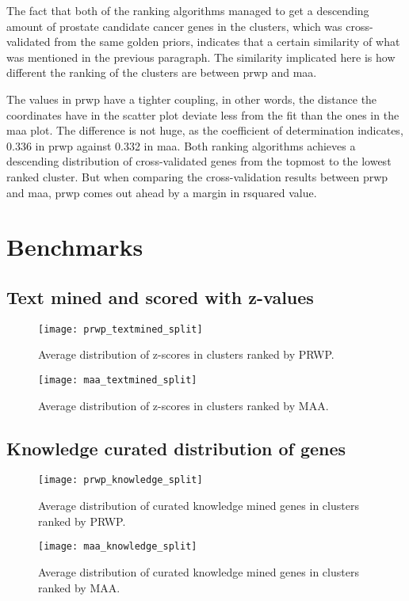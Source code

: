 The fact that both of the ranking algorithms managed to get a descending amount
of prostate candidate cancer genes in the clusters, which was cross-validated
from the same \gls{golden} priors, indicates that a certain similarity of what
was mentioned in the previous paragraph. The similarity implicated here is how
different the ranking of the clusters are between \gls{prwp} and \gls{maa}.

The values in \gls{prwp} have a tighter coupling, in other words, the distance
the coordinates have in the scatter plot deviate less from the fit than the ones
in the \gls{maa} plot. The difference is not huge, as the coefficient of
determination indicates, 0.336 in \gls{prwp} against 0.332 in \gls{maa}. Both
ranking algorithms achieves a descending distribution of cross-validated genes
from the topmost to the lowest ranked cluster. But when comparing the
cross-validation results between \gls{prwp} and \gls{maa}, \gls{prwp} comes out
ahead by a margin in \gls{rsquared} value.

\section{Benchmarks}

\subsection{Text mined and scored with z-values}
\begin{figure}[H]
    \label{fig:txt-iref-prwp}
    \texttt{[image: prwp\_textmined\_split]}
    \caption{Average distribution of z-scores in clusters ranked by PRWP.}
\end{figure}
\begin{figure}[H]
    \label{fig:txt-iref-maa}
    \texttt{[image: maa\_textmined\_split]}
    \caption{Average distribution of z-scores in clusters ranked by MAA.}
\end{figure}

\subsection{Knowledge curated distribution of genes}
\begin{figure}[H]
    \label{fig:know-iref-prwp}
    \texttt{[image: prwp\_knowledge\_split]}
    \caption{Average distribution of curated knowledge mined genes in clusters
    ranked by PRWP.}
\end{figure}
\begin{figure}[H]
    \label{fig:know-iref-maa}
    \texttt{[image: maa\_knowledge\_split]}
    \caption{Average distribution of curated knowledge mined genes in clusters
    ranked by MAA.}
\end{figure}
